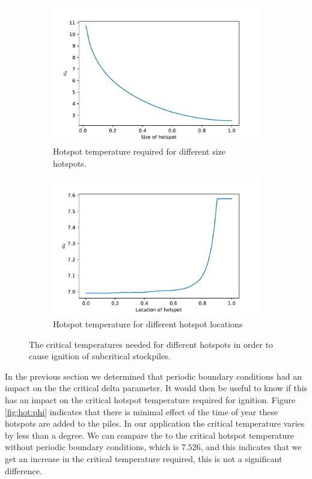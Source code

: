 \begin{figure}[h!]
\centering
\begin{subfigure}{.5\textwidth}
  \centering
  \includegraphics[width=\linewidth]{figures/NDA/Hotspot/size1.pdf}  
  \caption{Hotspot temperature required for different size hotspots.}
  \label{fig:hot:size}
\end{subfigure}%
\begin{subfigure}{.5\textwidth}
  \centering
  \includegraphics[width=\linewidth]{figures/NDA/Hotspot/Location1.pdf}
  \caption{Hotspot temperature for different hotspot locations}
  \label{fig:hot:loc}
\end{subfigure}
\label{fig:hot:size_loc}
\caption{The critical temperatures needed for different hotspots in order to cause ignition of subcritical stockpiles.}
\end{figure}

In the previous section we determined that periodic boundary conditions had an impact on the the critical delta parameter. It would then be useful to know if this has an impact on the critical hotspot temperature required for ignition. Figure \ref{fig:hot:phi} indicates that there is minimal effect of the time of year these hotspots are added to the piles. In our application the critical temperature varies by less than a degree. We can compare the to the critical hotspot temperature without periodic boundary conditions, which is $7.526$, and this indicates that we get an increase in the critical temperature required, this is not a significant difference. \\

